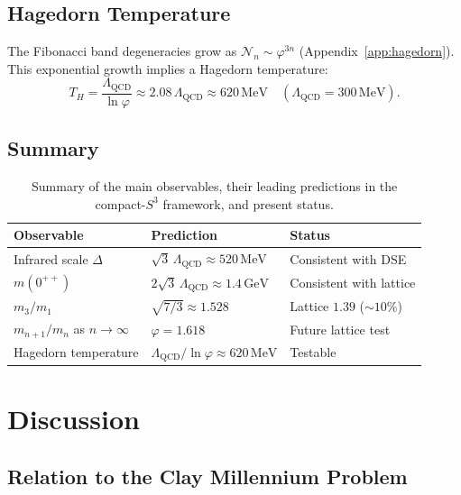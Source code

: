 \documentclass[
  aps,
  prd,
  reprint,
  superscriptaddress,
  nofootinbib,
  longbibliography,
  amsmath,
  amssymb
]{revtex4-2}
\theoremstyle{plain}
\theoremstyle{definition}
\theoremstyle{remark}
\newcommand{\vp}{\varphi}
\newcommand{\Lqcd}{\Lambda_{\mathrm{QCD}}}
\begin{document}
\subsection{Hagedorn Temperature}

The Fibonacci band degeneracies grow as $\mathcal{N}_n\sim\vp^{3n}$
(Appendix~\ref{app:hagedorn}). This exponential growth implies a
Hagedorn temperature:
\begin{equation}
  T_H = \frac{\Lqcd}{\ln\vp} \approx 2.08\,\Lqcd
  \approx 620\,\mathrm{MeV}\quad(\Lqcd=300\,\mathrm{MeV}).
  \label{eq:hagedorn}
\end{equation}

\subsection{Summary}

\begin{table}[t]
\caption{Summary of the main observables, their leading predictions in the compact-$S^3$ framework, and present status.}
\label{tab:summary}
\renewcommand{\arraystretch}{1.15}
\begin{tabular}{lll}
\toprule
Observable & Prediction & Status \\
\midrule
Infrared scale $\Delta$ & $\sqrt3\,\Lqcd\approx520\,\mathrm{MeV}$ & Consistent with DSE \\
$m(0^{++})$ & $2\sqrt3\,\Lqcd\approx1.4\,\mathrm{GeV}$ & Consistent with lattice \\
$m_3/m_1$ & $\sqrt{7/3}\approx1.528$ & Lattice $1.39$ ($\sim10\%$) \\
$m_{n+1}/m_n$ as $n\to\infty$ & $\vp=1.618$ & Future lattice test \\
Hagedorn temperature & $\Lqcd/\ln\vp\approx620\,\mathrm{MeV}$ & Testable \\
\bottomrule
\end{tabular}
\end{table}

\section{Discussion}
\label{sec:disc}

\subsection{Relation to the Clay Millennium Problem}
\end{document}
